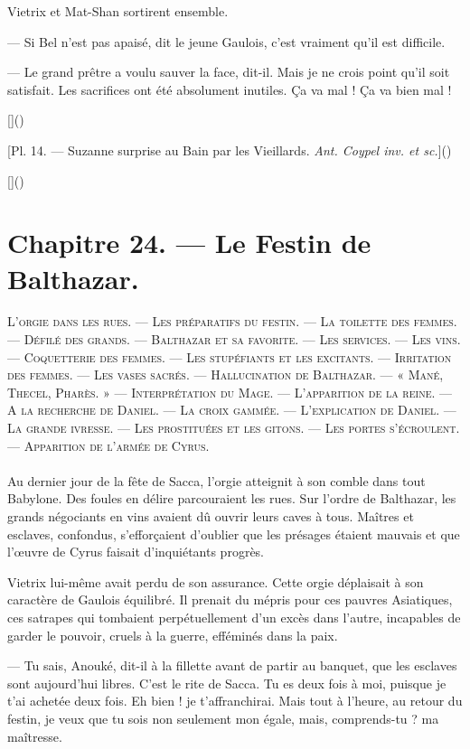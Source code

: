 \documentclass[a4paper, 11pt, oneside, polutonikogreek, french]{article}
\begin{document}
Vietrix et Mat-Shan sortirent ensemble.

--- Si Bel n'est pas apaisé, dit le jeune Gaulois, c'est vraiment qu'il est difficile.

--- Le grand prêtre a voulu sauver la face, dit-il. Mais je ne crois point qu'il soit satisfait. Les sacrifices ont été absolument inutiles. Ça va mal ! Ça va bien mal !

[]()

[Pl. 14. --- Suzanne surprise au Bain par les Vieillards. \emph{Ant. Coypel inv. et sc.}]()

[]()
\clearpage
\section{Chapitre 24. --- Le Festin de Balthazar.}
\begin{center}
\scshape
\small
L'orgie dans les rues. --- Les préparatifs du festin. --- La toilette des femmes. --- Défilé des grands. --- Balthazar et sa favorite. --- Les services. --- Les vins. --- Coquetterie des femmes. --- Les stupéfiants et les excitants. --- Irritation des femmes. --- Les vases sacrés. --- Hallucination de Balthazar. --- « Mané, Thecel, Pharès. » --- Interprétation du Mage. --- L'apparition de la reine. --- A la recherche de Daniel. --- La croix gammée. --- L'explication de Daniel. --- La grande ivresse. --- Les prostituées et les gitons. --- Les portes s'écroulent. --- Apparition de l'armée de Cyrus.
\end{center}
\paragraph{}
Au dernier jour de la fête de Sacca, l'orgie atteignit à son comble dans tout Babylone. Des foules en délire parcouraient les rues. Sur l'ordre de Balthazar, les grands négociants en vins avaient dû ouvrir leurs caves à tous. Maîtres et esclaves, confondus, s'efforçaient d'oublier que les présages étaient mauvais et que l'œuvre de Cyrus faisait d'inquiétants progrès.

Vietrix lui-même avait perdu de son assurance. Cette orgie déplaisait à son caractère de Gaulois équilibré. Il prenait du mépris pour ces pauvres Asiatiques, ces satrapes qui tombaient perpétuellement d'un excès dans l'autre, incapables de garder le pouvoir, cruels à la guerre, efféminés dans la paix.

--- Tu sais, Anouké, dit-il à la fillette avant de partir au banquet, que les esclaves sont aujourd'hui libres. C'est le rite de Sacca. Tu es deux fois à moi, puisque je t'ai achetée deux fois. Eh bien ! je t'affranchirai. Mais tout à l'heure, au retour du festin, je veux que tu sois non seulement mon égale, mais, comprends-tu ? ma maîtresse.
\end{document}
